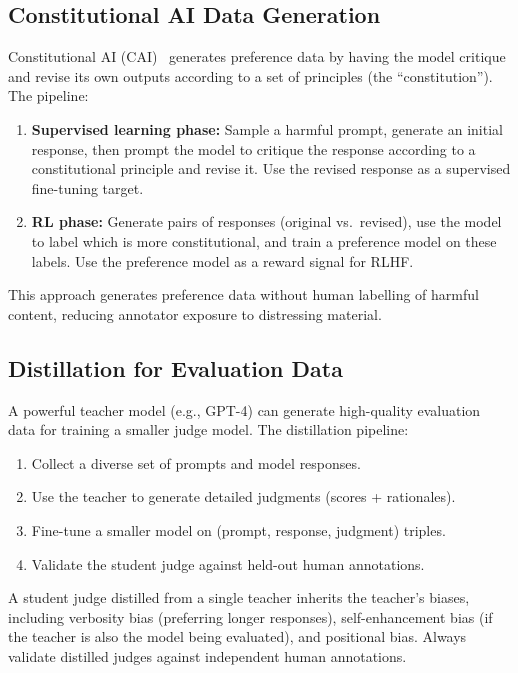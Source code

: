 \subsection{Constitutional AI Data Generation}
\label{constitutional-ai-data-generation}

Constitutional AI (CAI)~\cite{bai2022constitutional} generates preference data by having the model critique and revise its own outputs according to a set of principles (the ``constitution''). The pipeline:

\begin{enumerate}
  \item \textbf{Supervised learning phase:} Sample a harmful prompt, generate an initial response, then prompt the model to critique the response according to a constitutional principle and revise it. Use the revised response as a supervised fine-tuning target.
  \item \textbf{RL phase:} Generate pairs of responses (original vs.~revised), use the model to label which is more constitutional, and train a preference model on these labels. Use the preference model as a reward signal for RLHF.
\end{enumerate}

This approach generates preference data without human labelling of harmful content, reducing annotator exposure to distressing material.

\subsection{Distillation for Evaluation Data}
\label{distillation-for-evaluation-data}

A powerful teacher model (e.g., GPT-4) can generate high-quality evaluation data for training a smaller judge model. The distillation pipeline:

\begin{enumerate}
  \item Collect a diverse set of prompts and model responses.
  \item Use the teacher to generate detailed judgments (scores + rationales).
  \item Fine-tune a smaller model on (prompt, response, judgment) triples.
  \item Validate the student judge against held-out human annotations.
\end{enumerate}

\begin{warningbox}
A student judge distilled from a single teacher inherits the teacher’s biases, including verbosity bias (preferring longer responses), self-enhancement bias (if the teacher is also the model being evaluated), and positional bias. Always validate distilled judges against independent human annotations.
\end{warningbox}

